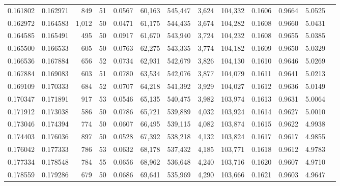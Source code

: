 \begin{tabular}{rrrrrrrrrrrrr}
0.161802 & 0.162971 &   849 &  51 &                                     0.0567 &  60,163 & 545,447 &   3,624 & 104,332 & 0.1606 & 0.9664 & 5.0525 \\
0.162972 & 0.164583 & 1,012 &  50 &                                     0.0471 &  61,175 & 544,435 &   3,674 & 104,282 & 0.1608 & 0.9660 & 5.0431 \\
0.164585 & 0.165491 &   495 &  50 &                                     0.0917 &  61,670 & 543,940 &   3,724 & 104,232 & 0.1608 & 0.9655 & 5.0385 \\
0.165500 & 0.166533 &   605 &  50 &                                     0.0763 &  62,275 & 543,335 &   3,774 & 104,182 & 0.1609 & 0.9650 & 5.0329 \\
0.166536 & 0.167884 &   656 &  52 &                                     0.0734 &  62,931 & 542,679 &   3,826 & 104,130 & 0.1610 & 0.9646 & 5.0269 \\
0.167884 & 0.169083 &   603 &  51 &                                     0.0780 &  63,534 & 542,076 &   3,877 & 104,079 & 0.1611 & 0.9641 & 5.0213 \\
0.169109 & 0.170333 &   684 &  52 &                                     0.0707 &  64,218 & 541,392 &   3,929 & 104,027 & 0.1612 & 0.9636 & 5.0149 \\
0.170347 & 0.171891 &   917 &  53 &                                     0.0546 &  65,135 & 540,475 &   3,982 & 103,974 & 0.1613 & 0.9631 & 5.0064 \\
0.171912 & 0.173038 &   586 &  50 &                                     0.0786 &  65,721 & 539,889 &   4,032 & 103,924 & 0.1614 & 0.9627 & 5.0010 \\
0.173046 & 0.174394 &   774 &  50 &                                     0.0607 &  66,495 & 539,115 &   4,082 & 103,874 & 0.1615 & 0.9622 & 4.9938 \\
0.174403 & 0.176036 &   897 &  50 &                                     0.0528 &  67,392 & 538,218 &   4,132 & 103,824 & 0.1617 & 0.9617 & 4.9855 \\
0.176042 & 0.177333 &   786 &  53 &                                     0.0632 &  68,178 & 537,432 &   4,185 & 103,771 & 0.1618 & 0.9612 & 4.9783 \\
0.177334 & 0.178548 &   784 &  55 &                                     0.0656 &  68,962 & 536,648 &   4,240 & 103,716 & 0.1620 & 0.9607 & 4.9710 \\
0.178559 & 0.179286 &   679 &  50 &                                     0.0686 &  69,641 & 535,969 &   4,290 & 103,666 & 0.1621 & 0.9603 & 4.9647 \\

\end{tabular}
